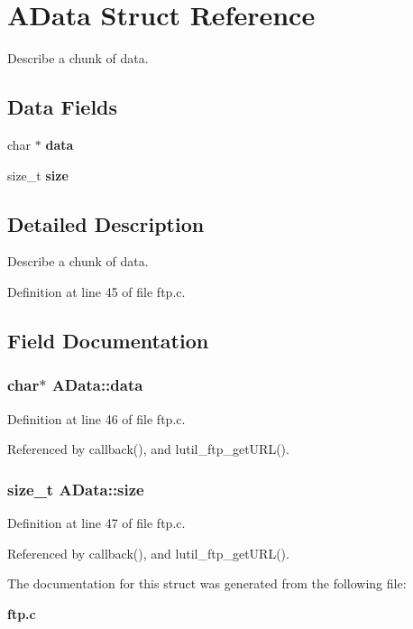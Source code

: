 \section{AData Struct Reference}
\label{structAData}
Describe a chunk of data.  


\subsection*{Data Fields}
\begin{CompactItemize}
\item 
char $\ast$ {\bf data}
\item 
size\_\-t {\bf size}
\end{CompactItemize}


\subsection{Detailed Description}
Describe a chunk of data. 



Definition at line 45 of file ftp.c.

\subsection{Field Documentation}
\subsubsection{\setlength{\rightskip}{0pt plus 5cm}char$\ast$ {\bf AData::data}}\label{structAData_o0}




Definition at line 46 of file ftp.c.

Referenced by callback(), and lutil\_\-ftp\_\-get\-URL().
\subsubsection{\setlength{\rightskip}{0pt plus 5cm}size\_\-t {\bf AData::size}}\label{structAData_o1}




Definition at line 47 of file ftp.c.

Referenced by callback(), and lutil\_\-ftp\_\-get\-URL().

The documentation for this struct was generated from the following file:\begin{CompactItemize}
\item 
{\bf ftp.c}\end{CompactItemize}
